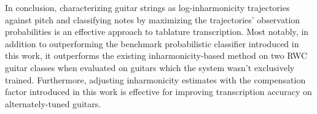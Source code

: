 \documentclass[12pt]{cmuthesis}
\begin{document}
In conclusion, characterizing guitar strings as log-inharmonicity trajectories against pitch and classifying notes by maximizing the trajectories' observation probabilities is an effective approach to tablature transcription. Most notably, in addition to outperforming the benchmark probabilistic classifier introduced in this work, it outperforms the existing inharmonicity-based method on two RWC guitar classes when evaluated on guitars which the system wasn't exclusively trained. Furthermore, adjusting inharmonicity estimates with the compensation factor introduced in this work is effective for improving transcription accuracy on alternately-tuned guitars.




%

\backmatter


\renewcommand{\bibsection}{\chapter{\bibname}}

\end{document}

